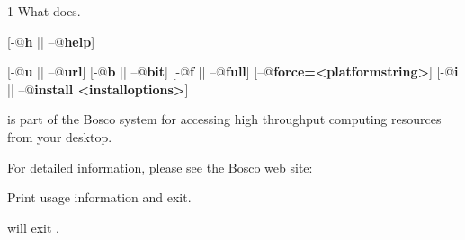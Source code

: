 \begin{ManPage}{\label{man-bosco-findplatform}}{1}
{What  does. }


\Synopsis {}
[\verb@-@\textbf{h} || \verb@--@\textbf{help}]

[\verb@-@\textbf{u} || \verb@--@\textbf{url}]
[\verb@-@\textbf{b} || \verb@--@\textbf{bit}]
[\verb@-@\textbf{f} || \verb@--@\textbf{full}]
[\verb@--@\textbf{force=<platformstring>}]
[\verb@-@\textbf{i} || \verb@--@\textbf{install <installoptions>}]

\Description

 is part of the Bosco system for accessing high
throughput computing resources from your desktop.

For detailed information, please see the Bosco web site:

\begin{Options}
   {Print usage information and exit.}

\end{Options}

\ExitStatus

 will exit \Dots.
\end{ManPage}
